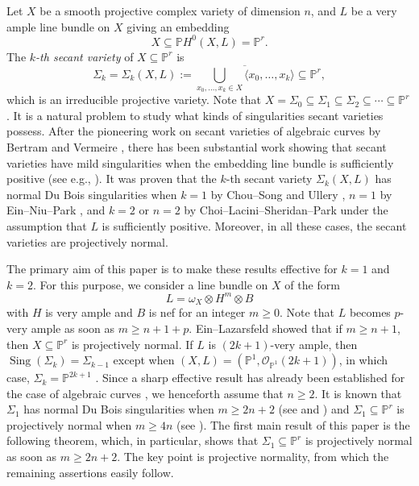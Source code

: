 \documentclass{amsart}
\theoremstyle{plain}
\theoremstyle{definition}
\theoremstyle{remark}
\begin{document}
\noindent Let $X$ be a smooth projective complex variety of dimension $n$, and $L$ be a very ample line bundle on $X$ giving an embedding
$$
X \subseteq \mathbb{P} H^0(X, L) = \mathbb{P}^r.
$$
The \emph{$k$-th secant variety} of $X \subseteq \mathbb{P}^r$ is
$$
\Sigma_k = \Sigma_k(X, L) := \overline{\bigcup_{x_0, \ldots, x_{k} \in X} \langle x_0, \ldots, x_{k} \rangle} \subseteq \mathbb{P}^r, 
$$
which is an irreducible projective variety. 
Note that $X=\Sigma_0 \subseteq \Sigma_1 \subseteq \Sigma_2 \subseteq \cdots \subseteq \mathbb{P}^r$.
It is a natural problem to study what kinds of singularities secant varieties possess. After the pioneering work on secant varieties of algebraic curves by Bertram \cite{Bertram} and Vermeire \cite{Vermeire}, there has been substantial work showing that secant varieties have mild singularities when the embedding line bundle is sufficiently positive (see e.g., \cite{Choi.Lacini.Park.Sheridan.25, Chou.Song.18, Ein.Niu.Park.20, Olano.Raychaudhury.Song, Ullery.16}). It was proven that the $k$-th secant variety $\Sigma_k(X, L)$ has normal Du Bois singularities when $k=1$ by Chou--Song \cite[Theorem 1.2]{Chou.Song.18} and Ullery \cite[Corollary C]{Ullery.16}, $n=1$ by Ein--Niu--Park \cite[Theorem 1.1]{Ein.Niu.Park.20}, and $k=2$ or $n=2$ by Choi--Lacini--Sheridan--Park \cite[Theorem A]{Choi.Lacini.Park.Sheridan.25} under the assumption that $L$ is sufficiently positive. Moreover, in all these cases, the secant varieties are projectively normal. 

\medskip

The primary aim of this paper is to make these results effective for $k=1$ and $k=2$. For this purpose, we consider a line bundle on $X$ of the form 
$$
L = \omega_X \otimes H^m \otimes B
$$
with $H$ is very ample and $B$ is nef for an integer $m \geq 0$. Note that $L$ becomes $p$-very ample as soon as $m \geq n+1+p$. Ein--Lazarsfeld \cite[Theorem 1]{Ein.Lazarsfeld.93} showed that if $m \geq n+1$, then $X \subseteq \mathbb{P}^r$ is projectively normal. 
If $L$ is $(2k+1)$-very ample, then $\operatorname{Sing}(\Sigma_k) = \Sigma_{k-1}$
except when $(X, L) = (\mathbb{P}^1, \mathcal{O}_{\mathbb{P}^1}(2k+1))$, in which case, $\Sigma_k = \mathbb{P}^{2k+1}$ \cite[Corollary E]{Choi.Lacini.Park.Sheridan.25}. Since a sharp effective result has already been established for the case of algebraic curves \cite{Ein.Niu.Park.20}, we henceforth assume that $n \geq 2$. 
It is known that $\Sigma_1$ has normal Du Bois singularities when $m \geq 2n+2$ (see \cite[Theorem 1.2]{Chou.Song.18} and \cite[Corollary C]{Ullery.16}) and $\Sigma_1 \subseteq \mathbb{P}^r$ is projectively normal when $m \geq 4n$ (see \cite[Theorem G]{Choi.Lacini.Park.Sheridan.25}). The first main result of this paper is the following theorem, which, in particular, shows that $\Sigma_1 \subseteq \mathbb{P}^r$ is projectively normal as soon as $m \geq 2n+2$. The key point is projective normality, from which the remaining assertions easily follow.
\end{document}
